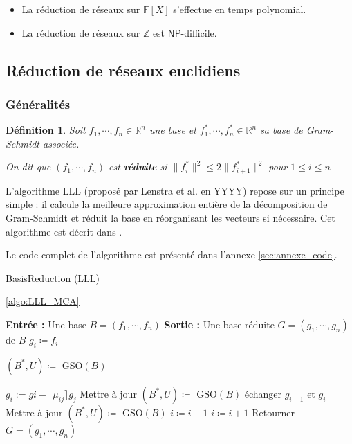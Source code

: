 \documentclass[a4paper,12pt]{report}  %
\theoremstyle{definitionstyle}
\newtheorem{definition}{Définition}[chapter] %
\theoremstyle{examplestyle}
\theoremstyle{remarkstyle}
\theoremstyle{propositionstyle}
\theoremstyle{theoremstyle}
\theoremstyle{proofstyle}
\begin{document}
	\begin{itemize}
		\item La réduction de réseaux sur $\mathbb{F}[X]$ s'effectue en temps polynomial.
		\item La réduction de réseaux sur $\mathbb{Z}$ est $\mathsf{NP}$-difficile.
	\end{itemize}	
	
	\subsection{Réduction de réseaux euclidiens}
	
	\subsubsection{Généralités}
	
	\begin{definition}{\cite{MCA}}
		Soit $f_1, \cdots, f_n \in \mathbb{R}^n$ une base et $f_1^*, \cdots, f_n^*\in\mathbb{R}^n$ sa base de Gram-Schmidt associée.
		
		On dit que $(f_1, \cdots, f_n)$ est \textbf{réduite} si $\|f_i^*\|^2 \leq 2 \| f_{i+1}^*\|^2$ pour $1 \leq i \leq n$ 
	\end{definition}
	
	L'algorithme LLL (proposé par Lenstra et al. en YYYY) repose sur un principe simple : il calcule la meilleure approximation entière de la décomposition de Gram-Schmidt et réduit la base en réorganisant les vecteurs si nécessaire. Cet algorithme est décrit dans \cite{MCA}.
	
	Le code complet de l'algorithme est présenté dans l'annexe \ref{sec:annexe_code}.
	\begin{algorithm}
		\caption{BasisReduction (LLL) \cite{MCA}}
		\label{algo:LLL_MCA} 
		\ref{algo:LLL_MCA}
			
		\begin{algorithmic}[1]
			\State \textbf{Entrée :} Une base $B=(f_1, \cdots, f_n)$
			\State \textbf{Sortie :} Une base réduite $G=(g_1, \cdots, g_n)$ de $B$
				\State $g_i \coloneqq f_i$
			\EndFor
			
			\State $(B^*, U)\coloneqq$ GSO$(B)$
			
			\State $g_i:=gi-\lfloor \mu_{ij} \rceil g_j$
			\State Mettre à jour $(B^*, U)\coloneqq$ GSO$(B)$
			\EndFor
			\State échanger $g_{i-1}$ et $g_i$
			\State Mettre à jour $(B^*, U)\coloneqq$ GSO$(B)$
			\State $i \coloneqq i-1$ 
			\Else 
			\State $i \coloneqq i+1$
			\EndIf
			\EndWhile
			\State Retourner $G=(g_1, \cdots, g_n)$
		\end{algorithmic}
	\end{algorithm}
	
\end{document}
